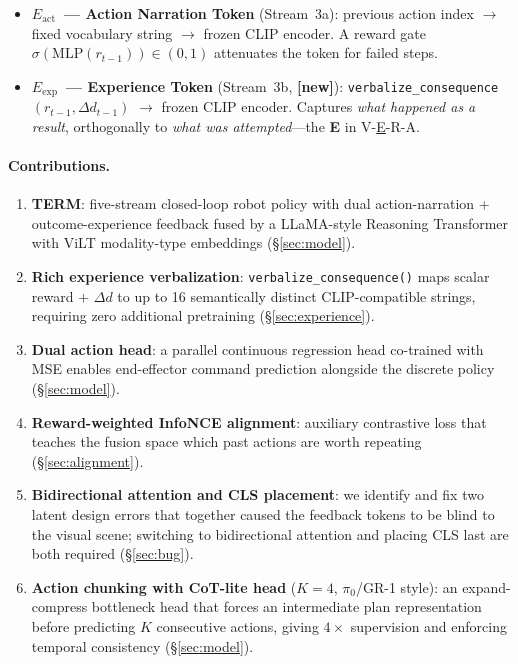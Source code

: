 \documentclass{article}
\newcommand{\modelname}{\textsc{TERM}\xspace}
\newcommand{\Lact}{$E_{\mathrm{act}}$\xspace}
\newcommand{\Lexp}{$E_{\mathrm{exp}}$\xspace}
\newcommand{\NEW}{\textcolor{NewOrange}{\textbf{[new]}}\xspace}
\begin{document}
\begin{itemize}[leftmargin=1.5em,itemsep=2pt]
\item \textbf{\Lact\ — Action Narration Token} (Stream~3a): previous action
  index $\to$ fixed vocabulary string $\to$ frozen CLIP encoder.
  A reward gate $\sigma(\mathrm{MLP}(r_{t-1}))\!\in\!(0,1)$ attenuates
  the token for failed steps.
\item \textbf{\Lexp\ — Experience Token} (Stream~3b, \NEW):
  \texttt{verbalize\_consequence}$(r_{t-1}, \Delta d_{t-1})$ $\to$
  frozen CLIP encoder. Captures \emph{what happened as a result},
  orthogonally to \emph{what was attempted}---the \textbf{E} in
  V-\underline{E}-R-A.
\end{itemize}

\paragraph{Contributions.}
\begin{enumerate}[leftmargin=1.5em,itemsep=2pt]
\item \textbf{\modelname}: five-stream closed-loop robot policy with dual
  action-narration + outcome-experience feedback fused by a LLaMA-style
  Reasoning Transformer with ViLT modality-type embeddings (\S\ref{sec:model}).
\item \textbf{Rich experience verbalization}: \texttt{verbalize\_consequence()}
  maps scalar reward $+$ $\Delta d$ to up to 16 semantically distinct
  CLIP-compatible strings, requiring zero additional pretraining
  (\S\ref{sec:experience}).
\item \textbf{Dual action head}: a parallel continuous regression head
  co-trained with MSE enables end-effector command prediction alongside the
  discrete policy (\S\ref{sec:model}).
\item \textbf{Reward-weighted InfoNCE alignment}: auxiliary contrastive loss
  that teaches the fusion space which past actions are worth repeating
  (\S\ref{sec:alignment}).
\item \textbf{Bidirectional attention and CLS placement}: we identify and
  fix two latent design errors that together caused the feedback tokens to
  be blind to the visual scene; switching to bidirectional attention and
  placing CLS last are both required (\S\ref{sec:bug}).
\item \textbf{Action chunking with CoT-lite head} ($K{=}4$, $\pi_0$/GR-1
  style): an expand-compress bottleneck head that forces an intermediate
  plan representation before predicting $K$ consecutive actions, giving
  $4{\times}$ supervision and enforcing temporal consistency (\S\ref{sec:model}).
\end{enumerate}
\end{document}
